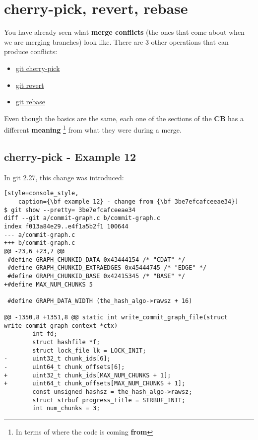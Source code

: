 
\section{cherry-pick, revert, rebase}
\label{other_ops}

You have already seen what {\bf merge conflicts} (the ones that come about when we are merging branches) look like.
There are 3 other operations that can produce conflicts:

\begin{itemize}
	\item \hyperref[cherry_pick]{git cherry-pick}
	\item \hyperref[revert]{git revert}
	\item \hyperref[rebase]{git rebase}
\end{itemize}

Even though the basics are the same, each one of the sections of the {\bf CB} has a different {\bf meaning}
\footnote{In terms of where the code is coming {\bf from}} from what they were during a merge.

\subsection{cherry-pick - Example 12}
\label{cherry_pick}
\label{example_12}

In git 2.27, this change was introduced:
\begin{lstlisting}[style=console_style,
	caption={\bf example 12} - change from {\bf 3be7efcafceeae34}]
$ git show --pretty= 3be7efcafceeae34
diff --git a/commit-graph.c b/commit-graph.c
index f013a84e29..e4f1a5b2f1 100644
--- a/commit-graph.c
+++ b/commit-graph.c
@@ -23,6 +23,7 @@
 #define GRAPH_CHUNKID_DATA 0x43444154 /* "CDAT" */
 #define GRAPH_CHUNKID_EXTRAEDGES 0x45444745 /* "EDGE" */
 #define GRAPH_CHUNKID_BASE 0x42415345 /* "BASE" */
+#define MAX_NUM_CHUNKS 5
 
 #define GRAPH_DATA_WIDTH (the_hash_algo->rawsz + 16)
 
@@ -1350,8 +1351,8 @@ static int write_commit_graph_file(struct write_commit_graph_context *ctx)
        int fd;
        struct hashfile *f;
        struct lock_file lk = LOCK_INIT;
-       uint32_t chunk_ids[6];
-       uint64_t chunk_offsets[6];
+       uint32_t chunk_ids[MAX_NUM_CHUNKS + 1];
+       uint64_t chunk_offsets[MAX_NUM_CHUNKS + 1];
        const unsigned hashsz = the_hash_algo->rawsz;
        struct strbuf progress_title = STRBUF_INIT;
        int num_chunks = 3;
\end{lstlisting}

